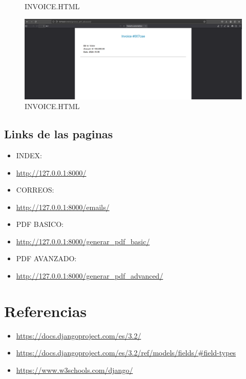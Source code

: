 \documentclass{article}
\begin{document}
\begin{itemize}
\begin{figure}[H]
            \caption{INVOICE.HTML}
        \end{figure}
        \begin{figure}[H]
            \centering
            \includegraphics[width=1.0\textwidth]{img/Cap9.png}
            \caption{INVOICE.HTML}
        \end{figure}
    \end{itemize}

    \subsection{Links de las paginas}
    \begin{itemize}			
        \item INDEX:
        \item \url{http://127.0.0.1:8000/}
        \item CORREOS:
        \item \url{http://127.0.0.1:8000/emails/}
        \item PDF BASICO:
        \item \url{http://127.0.0.1:8000/generar_pdf_basic/}
        \item PDF AVANZADO:
        \item \url{http://127.0.0.1:8000/generar_pdf_advanced/}
    \end{itemize}

\section{Referencias}
\begin{itemize}			
	\item \url{https://docs.djangoproject.com/es/3.2/}
	\item \url{https://docs.djangoproject.com/es/3.2/ref/models/fields/#field-types}
	\item \url{https://www.w3schools.com/django/}
\end{itemize}	
	
%
%
%
			
\end{document}
